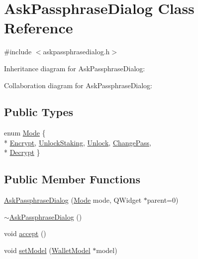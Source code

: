 \hypertarget{class_ask_passphrase_dialog}{}\section{Ask\+Passphrase\+Dialog Class Reference}
\label{class_ask_passphrase_dialog}


{\ttfamily \#include $<$askpassphrasedialog.\+h$>$}



Inheritance diagram for Ask\+Passphrase\+Dialog\+:


Collaboration diagram for Ask\+Passphrase\+Dialog\+:
\subsection*{Public Types}
\begin{DoxyCompactItemize}
\item 
enum \hyperlink{class_ask_passphrase_dialog_a96abf4d3c36c1ef9e268fb546ae76538}{Mode} \{ \\*
\hyperlink{class_ask_passphrase_dialog_a96abf4d3c36c1ef9e268fb546ae76538a5894886141cada548b21488927acc467}{Encrypt}, 
\hyperlink{class_ask_passphrase_dialog_a96abf4d3c36c1ef9e268fb546ae76538a913cd3fda90d33b397ebf191365ecc91}{Unlock\+Staking}, 
\hyperlink{class_ask_passphrase_dialog_a96abf4d3c36c1ef9e268fb546ae76538a2af79cac6134924405d6c620fb0f4c7e}{Unlock}, 
\hyperlink{class_ask_passphrase_dialog_a96abf4d3c36c1ef9e268fb546ae76538abc3f96ab0f90c0a3b0606407b4f662cc}{Change\+Pass}, 
\\*
\hyperlink{class_ask_passphrase_dialog_a96abf4d3c36c1ef9e268fb546ae76538aac5e2489527af224fc5e1316a77ba478}{Decrypt}
 \}
\end{DoxyCompactItemize}
\subsection*{Public Member Functions}
\begin{DoxyCompactItemize}
\item 
\hyperlink{class_ask_passphrase_dialog_a5bf3d4d81d7dbe15bee48f7ca2ee42b2}{Ask\+Passphrase\+Dialog} (\hyperlink{class_ask_passphrase_dialog_a96abf4d3c36c1ef9e268fb546ae76538}{Mode} mode, Q\+Widget $\ast$parent=0)
\item 
\hyperlink{class_ask_passphrase_dialog_ab5f923af5131db88c6a44a15559b461c}{$\sim$\+Ask\+Passphrase\+Dialog} ()
\item 
void \hyperlink{class_ask_passphrase_dialog_ac2f176af3693b73870d26ef0bfc6cbb9}{accept} ()
\item 
void \hyperlink{class_ask_passphrase_dialog_a35b83e1ef98813b6b88155aab0803ed3}{set\+Model} (\hyperlink{class_wallet_model}{Wallet\+Model} $\ast$model)
\end{DoxyCompactItemize}
